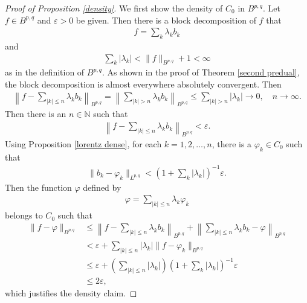 \documentclass[10pt,reqno]{amsart}
\numberwithin{equation}{section}
\begin{document}
\begin{proof}[Proof of Proposition \ref{density}]
We first show the density of $C_{0}$ in $B^{p,q}$. Let $f\in B^{p,q}$ and $\varepsilon>0$ be given. Then there is a block decomposition of $f$ that 
\begin{align*}
f=\sum_{k}\lambda_{k}b_{k}
\end{align*}
and 
\begin{align*}
\sum_{k}|\lambda_{k}|<\|f\|_{B^{p,q}}+1<\infty
\end{align*}
as in the definition of $B^{p,q}$. As shown in the proof of Theorem \ref{second predual}, the block decomposition is almost everywhere absolutely convergent. Then
\begin{align*}
\left\|f-\sum_{|k|\leq n}\lambda_{k}b_{k}\right\|_{B^{p,q}}=\left\|\sum_{|k|>n}\lambda_{k}b_{k}\right\|_{B^{p,q}}\leq\sum_{|k|>n}|\lambda_{k}|\rightarrow 0,\quad n\rightarrow\infty.
\end{align*}
Then there is an $n\in\mathbb{N}$ such that 
\begin{align*}
\left\|f-\sum_{|k|\leq n}\lambda_{k}b_{k}\right\|_{B^{p,q}}<\varepsilon.
\end{align*}
Using Proposition \ref{lorentz dense}, for each $k=1,2,\ldots,n$, there is a $\varphi_{k}\in C_{0}$ such that 
\begin{align*}
\|b_{k}-\varphi_{k}\|_{L^{p,q}}<\left(1+\sum_{k}|\lambda_{k}|\right)^{-1}\varepsilon.
\end{align*}
Then the function $\varphi$ defined by
\begin{align*}
\varphi=\sum_{|k|\leq n}\lambda_{k}\varphi_{k}
\end{align*}
belongs to $C_{0}$ such that 
\begin{align*}
\|f-\varphi\|_{B^{p,q}}&\leq\left\|f-\sum_{|k|\leq n}\lambda_{k}b_{k}\right\|_{B^{p,q}}+\left\|\sum_{|k|\leq n}\lambda_{k}b_{k}-\varphi\right\|_{B^{p,q}}\\
&<\varepsilon+\sum_{|k|\leq n}|\lambda_{k}|\|f-\varphi_{k}\|_{B^{p,q}}\\
&\leq\varepsilon+\left(\sum_{|k|\leq n}|\lambda_{k}|\right)\left(1+\sum_{k}|\lambda_{k}|\right)^{-1}\varepsilon\\
&\leq 2\varepsilon,
\end{align*}
which justifies the density claim.


\end{proof}
\end{document}
